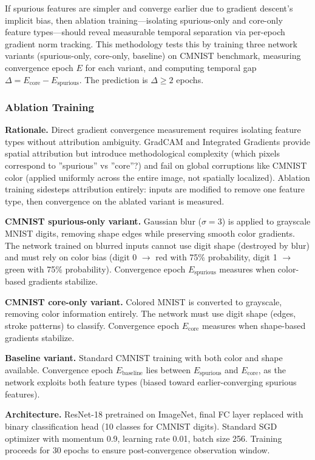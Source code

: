 
If spurious features are simpler and converge earlier due to gradient descent's implicit bias, then ablation training---isolating spurious-only and core-only feature types---should reveal measurable temporal separation via per-epoch gradient norm tracking. This methodology tests this by training three network variants (spurious-only, core-only, baseline) on CMNIST benchmark, measuring convergence epoch $E$ for each variant, and computing temporal gap $\Delta = E_{\text{core}} - E_{\text{spurious}}$. The prediction is $\Delta \geq 2$ epochs.

\subsubsection{Ablation Training}

\textbf{Rationale.} Direct gradient convergence measurement requires isolating feature types without attribution ambiguity. GradCAM and Integrated Gradients provide spatial attribution but introduce methodological complexity (which pixels correspond to ''spurious'' vs ''core''?) and fail on global corruptions like CMNIST color (applied uniformly across the entire image, not spatially localized). Ablation training sidesteps attribution entirely: inputs are modified to remove one feature type, then convergence on the ablated variant is measured.

\textbf{CMNIST spurious-only variant.} Gaussian blur ($\sigma=3$) is applied to grayscale MNIST digits, removing shape edges while preserving smooth color gradients. The network trained on blurred inputs cannot use digit shape (destroyed by blur) and must rely on color bias (digit 0 $\rightarrow$ red with 75\% probability, digit 1 $\rightarrow$ green with 75\% probability). Convergence epoch $E_{\text{spurious}}$ measures when color-based gradients stabilize.

\textbf{CMNIST core-only variant.} Colored MNIST is converted to grayscale, removing color information entirely. The network must use digit shape (edges, stroke patterns) to classify. Convergence epoch $E_{\text{core}}$ measures when shape-based gradients stabilize.

\textbf{Baseline variant.} Standard CMNIST training with both color and shape available. Convergence epoch $E_{\text{baseline}}$ lies between $E_{\text{spurious}}$ and $E_{\text{core}}$, as the network exploits both feature types (biased toward earlier-converging spurious features).

\textbf{Architecture.} ResNet-18 pretrained on ImageNet, final FC layer replaced with binary classification head (10 classes for CMNIST digits). Standard SGD optimizer with momentum 0.9, learning rate 0.01, batch size 256. Training proceeds for 30 epochs to ensure post-convergence observation window.

